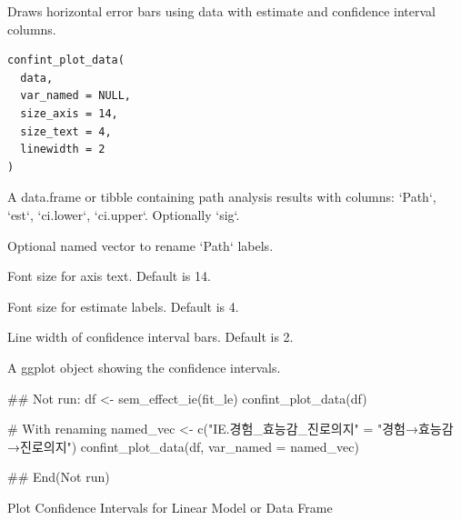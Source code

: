 \documentclass[a4paper]{book}
\begin{document}
%
\begin{Description}
Draws horizontal error bars using data with estimate and confidence interval columns.
\end{Description}
%
\begin{Usage}
\begin{verbatim}
confint_plot_data(
  data,
  var_named = NULL,
  size_axis = 14,
  size_text = 4,
  linewidth = 2
)
\end{verbatim}
\end{Usage}
%
\begin{Arguments}
\begin{ldescription}
\item[\code{data}] A data.frame or tibble containing path analysis results with columns: `Path`, `est`, `ci.lower`, `ci.upper`. Optionally `sig`.

\item[\code{var\_named}] Optional named vector to rename `Path` labels.

\item[\code{size\_axis}] Font size for axis text. Default is 14.

\item[\code{size\_text}] Font size for estimate labels. Default is 4.

\item[\code{linewidth}] Line width of confidence interval bars. Default is 2.
\end{ldescription}
\end{Arguments}
%
\begin{Value}
A ggplot object showing the confidence intervals.
\end{Value}
%
\begin{Examples}
\begin{ExampleCode}
## Not run: 
df <- sem_effect_ie(fit_le)
confint_plot_data(df)

# With renaming
named_vec <- c("IE.경험_효능감_진로의지" = "경험→효능감→진로의지")
confint_plot_data(df, var_named = named_vec)

## End(Not run)
\end{ExampleCode}
\end{Examples}
%
\begin{Description}
Plot Confidence Intervals for Linear Model or Data Frame
\end{Description}
\end{document}
